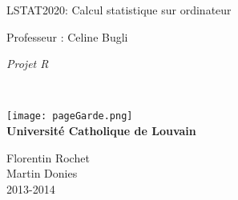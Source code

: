 \documentclass{article}
\begin{document}
\begin{titlepage}
    \begin{center}
        {\huge LSTAT2020: Calcul statistique sur ordinateur}\\
        \vspace{0.4cm}
        
        {\Large {Professeur : Celine Bugli}}\\
        \vspace{0.6cm}
        
        {\Large \textit{Projet R}}\\
        \vspace{1.2cm}

        \texttt{}\\
        \vspace{0.2cm}

        \texttt{[image: pageGarde.png]}\\
        \vspace{0.1cm}
        {\Large \textbf{Universit\'e Catholique de Louvain}}
        \vspace{0.7cm}

        \vspace{2cm}
        
        Florentin Rochet\\
        Martin Donies \\
        \vspace{0.2cm}
        2013-2014\\
    \end{center}
\end{titlepage}
\end{document}
